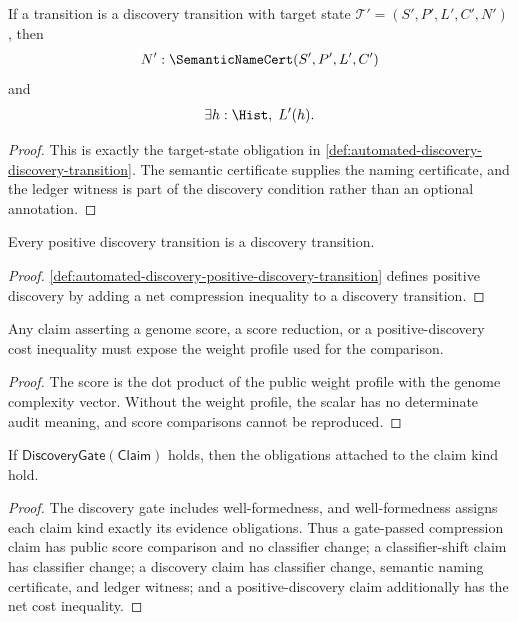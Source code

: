\begin{theorem}
\label{thm:automated-discovery-certificate-ledger-required}
If a transition is a discovery transition with target state
$\mathcal T'=(S',P',L',C',N')$, then
$$
N':\SemanticNameCert(S',P',L',C')
$$
and
$$
\exists h:\Hist,\;L'(h).
$$
\end{theorem}
\begin{proof}
This is exactly the target-state obligation in
\autoref{def:automated-discovery-discovery-transition}. The semantic
certificate supplies the naming certificate, and the ledger witness is part of
the discovery condition rather than an optional annotation.
\end{proof}

\begin{theorem}
\label{thm:automated-discovery-positive-implies-discovery}
Every positive discovery transition is a discovery transition.
\end{theorem}
\begin{proof}
\autoref{def:automated-discovery-positive-discovery-transition} defines
positive discovery by adding a net compression inequality to a discovery
transition.
\end{proof}

\begin{theorem}
\label{thm:automated-discovery-scored-claims-public-weights}
Any claim asserting a genome score, a score reduction, or a positive-discovery
cost inequality must expose the weight profile used for the comparison.
\end{theorem}
\begin{proof}
The score is the dot product of the public weight profile with the genome
complexity vector. Without the weight profile, the scalar has no determinate
audit meaning, and score comparisons cannot be reproduced.
\end{proof}

\begin{theorem}
\label{thm:automated-discovery-gate-kind-sound}
If $\mathsf{DiscoveryGate}(\mathsf{Claim})$ holds, then the obligations
attached to the claim kind hold.
\end{theorem}
\begin{proof}
The discovery gate includes well-formedness, and well-formedness assigns each
claim kind exactly its evidence obligations. Thus a gate-passed compression
claim has public score comparison and no classifier change; a classifier-shift
claim has classifier change; a discovery claim has classifier change,
semantic naming certificate, and ledger witness; and a positive-discovery
claim additionally has the net cost inequality.
\end{proof}

